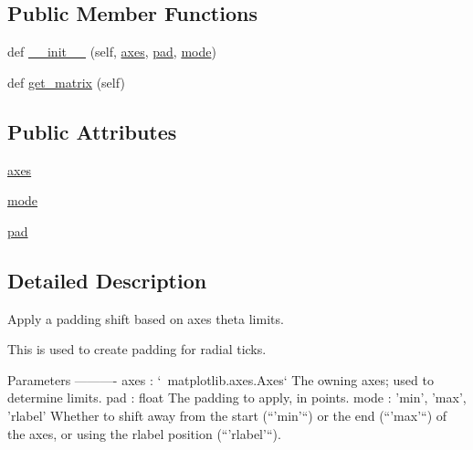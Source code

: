 \subsection*{Public Member Functions}
\begin{DoxyCompactItemize}
\item 
def \hyperlink{classmatplotlib_1_1projections_1_1polar_1_1__ThetaShift_ad2ee892ed8d538b10f128d87160fa3ee}{\+\_\+\+\_\+init\+\_\+\+\_\+} (self, \hyperlink{classmatplotlib_1_1projections_1_1polar_1_1__ThetaShift_acc5f97f484f05c56fa9b03d2d2117731}{axes}, \hyperlink{classmatplotlib_1_1projections_1_1polar_1_1__ThetaShift_a70652dfc7edd6f710c92e05670586e48}{pad}, \hyperlink{classmatplotlib_1_1projections_1_1polar_1_1__ThetaShift_ab61923d84ed7b3ab7cd4f282fb0cedfb}{mode})
\item 
def \hyperlink{classmatplotlib_1_1projections_1_1polar_1_1__ThetaShift_abba26ba55531bccc997b17eb1265f6fa}{get\+\_\+matrix} (self)
\end{DoxyCompactItemize}
\subsection*{Public Attributes}
\begin{DoxyCompactItemize}
\item 
\hyperlink{classmatplotlib_1_1projections_1_1polar_1_1__ThetaShift_acc5f97f484f05c56fa9b03d2d2117731}{axes}
\item 
\hyperlink{classmatplotlib_1_1projections_1_1polar_1_1__ThetaShift_ab61923d84ed7b3ab7cd4f282fb0cedfb}{mode}
\item 
\hyperlink{classmatplotlib_1_1projections_1_1polar_1_1__ThetaShift_a70652dfc7edd6f710c92e05670586e48}{pad}
\end{DoxyCompactItemize}


\subsection{Detailed Description}
\begin{DoxyVerb}Apply a padding shift based on axes theta limits.

This is used to create padding for radial ticks.

Parameters
----------
axes : `~matplotlib.axes.Axes`
    The owning axes; used to determine limits.
pad : float
    The padding to apply, in points.
mode : {'min', 'max', 'rlabel'}
    Whether to shift away from the start (``'min'``) or the end (``'max'``)
    of the axes, or using the rlabel position (``'rlabel'``).
\end{DoxyVerb}
 

